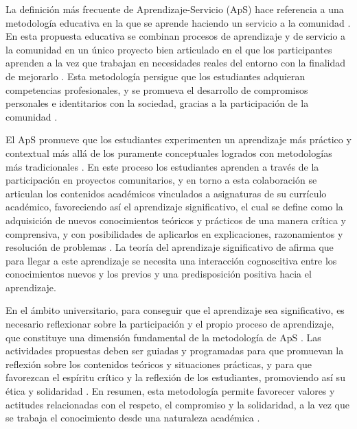 \documentclass[spanish]{textolivre}
\begin{document}
La definición más frecuente de Aprendizaje-Servicio (ApS) hace referencia a una metodología educativa en la que se aprende haciendo un servicio a la comunidad \cite{puig_aprendizaje_2009}. En esta propuesta educativa se combinan procesos de aprendizaje y de servicio a la comunidad en un único proyecto bien articulado en el que los participantes aprenden a la vez que trabajan en necesidades reales del entorno con la finalidad de mejorarlo \cite{salam_service_2019}. Esta metodología persigue que los estudiantes adquieran competencias profesionales, y se promueva el desarrollo de compromisos personales e identitarios con la sociedad, gracias a la participación de la comunidad \cite{huda_transmitting_2018,palpacuer_lee_shaping_2018}.

El ApS promueve que los estudiantes experimenten un aprendizaje más práctico y contextual más allá de los puramente conceptuales logrados con metodologías más tradicionales \cite{_martinez__2018,halberstadt_skills_2019}. En este proceso los estudiantes aprenden a través de la participación en proyectos comunitarios, y en torno a esta colaboración se articulan los contenidos académicos vinculados a asignaturas de su currículo académico, favoreciendo así el aprendizaje significativo, el cual se define como la adquisición de nuevos conocimientos teóricos y prácticos de una manera crítica y comprensiva, y con posibilidades de aplicarlos en explicaciones, razonamientos y resolución de problemas \cite{moreira_aprendizaje_2017}. La teoría del aprendizaje significativo de \textcite{ausubel_psicologieducativa:_1978} afirma que para llegar a este aprendizaje se necesita una interacción cognoscitiva entre los conocimientos nuevos y los previos y una predisposición positiva hacia el aprendizaje.

En el ámbito universitario, para conseguir que el aprendizaje sea significativo, es necesario reflexionar sobre la participación y el propio proceso de aprendizaje, que constituye una dimensión fundamental de la metodología de ApS \cite{martinez-usarralde_revision_2019}. Las actividades propuestas deben ser guiadas y programadas para que promuevan la reflexión sobre los contenidos teóricos y situaciones prácticas, y para que favorezcan el espíritu crítico y la reflexión de los estudiantes, promoviendo así su ética y solidaridad \cite{latta_approaching_2018}. En resumen, esta metodología permite favorecer valores y actitudes relacionadas con el respeto, el compromiso y la solidaridad, a la vez que se trabaja el conocimiento desde una naturaleza académica \cite{harada_alisis_2020}.
\end{document}
